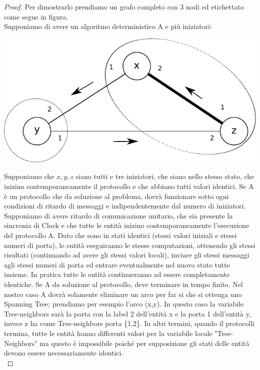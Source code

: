 \begin{proof}
    Per dimostrarlo prendiamo un grafo completo con 3 nodi ed etichettato come
    segue in figura.\\
    Supponiamo di avere un algoritmo deterministico A e più iniziatori:
    \begin{center}
        \includegraphics[scale=0.8]{capitoli/costruzione-spanning-tree/imgs/n_37}
    \end{center}

    Supponiamo che $x, y, z$ siano tutti e tre iniziatori, che siano nello
    stesso stato, che inizino contemporaneamente il protocollo e che abbiano
    tutti valori identici. Se A è un protocollo che da soluzione al problema,
    dovrà funzionare sotto ogni condizioni di ritardo di messaggi e
    indipendentemente dal numero di iniziatori. Supponiamo di avere ritardo di
    comunicazione unitario, che sia presente la sincronia di Clock e che tutte
    le entità inizino contemporaneamente l'esecuzione del protocollo A. Dato che
    sono in stati identici (stessi valori iniziali e stessi numeri di porta), le
    entità eseguiranno le stesse computazioni, ottenendo gli stessi risultati
    (continuando ad avere gli stessi valori locali), inviare gli stessi messaggi
    agli stessi numeri di porta ed entrare eventualmente nel nuovo stato tutte
    insieme. In pratica tutte le entità continueranno ad essere completamente
    identiche. Se A da soluzione al protocollo, deve terminare in tempo finito.
    Nel nostro caso A dovrà solamente eliminare un arco per far si che si
    ottenga uno Spanning Tree; prendiamo per esempio l'arco (x,y). In questo
    caso la variabile Tree-neighbors sarà la porta con la label 2 dell'entità x e
    la porta 1 dell'entità y, invece z ha come Tree-neighbors porta \{1,2\}. In
    altri termini, quando il protocolli termina, tutte le entità hanno
    differenti valori per la variabile locale "Tree-Neighbors" ma questo è
    impossibile poiché per supposizione gli stati delle entità devono essere
    necessariamente identici.\\


\end{proof}

